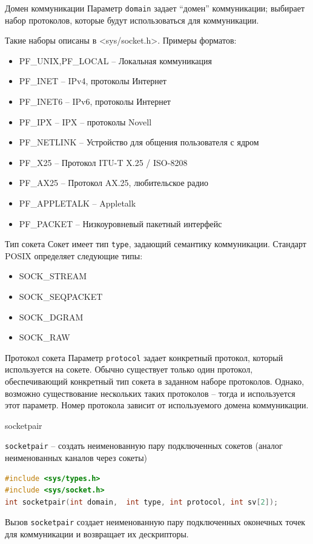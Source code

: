 \begin{frame}{Домен коммуникации}
Параметр {\tt domain} задает ``домен'' коммуникации; выбирает набор протоколов, которые будут использоваться для коммуникации.

Такие наборы описаны в <sys/socket.h>. Примеры форматов: 

\begin{itemize}
\item PF\_UNIX,PF\_LOCAL -- Локальная коммуникация
\item PF\_INET --	IPv4, протоколы Интернет
\item PF\_INET6 -- IPv6, протоколы Интернет
\item PF\_IPX -- IPX -- протоколы Novell
\item PF\_NETLINK -- Устройство для общения пользователя с ядром
\item PF\_X25 -- Протокол ITU-T X.25 / ISO-8208
\item PF\_AX25 -- Протокол AX.25, любительское радио 
\item PF\_APPLETALK -- Appletalk
\item PF\_PACKET -- Низкоуровневый пакетный интерфейс
\end{itemize}
\end{frame}

\begin{frame}{Тип сокета}
Сокет имеет тип {\tt type}, задающий семантику коммуникации. Стандарт POSIX определяет следующие типы:

\begin{itemize}
	\item SOCK\_STREAM 
	\item SOCK\_SEQPACKET
	\item SOCK\_DGRAM
	\item SOCK\_RAW
\end{itemize}
\end{frame}

\begin{frame}{Протокол сокета}
Параметр {\tt protocol} задает конкретный протокол, который используется на сокете. 
Обычно существует только один протокол, обеспечивающий конкретный тип сокета в 
заданном наборе протоколов. Однако, возможно существование нескольких таких 
протоколов -- тогда и используется этот параметр. 
Номер протокола зависит от используемого домена коммуникации.
\end{frame}

\begin{frame}[fragile]{socketpair}

{\tt socketpair} -- создать неименованную пару подключенных сокетов (аналог неименованных каналов через сокеты)

\scriptsize\begin{lstlisting}[language=C]
#include <sys/types.h> 
#include <sys/socket.h> 
int socketpair(int domain,  int type, int protocol, int sv[2]);
\end{lstlisting}

Вызов {\tt socketpair} создает неименованную пару подключенных оконечных точек для коммуникации и возвращает их дескрипторы.
\end{frame}


